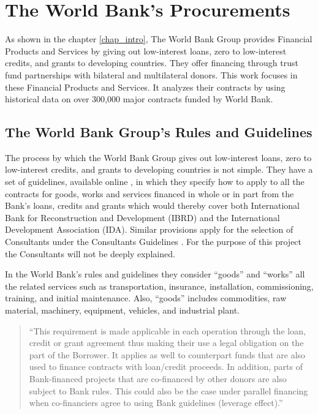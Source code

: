\chapter{The World Bank's Procurements}\label{chap_procurements}

As shown in the chapter \ref{chap_intro}, The World Bank Group provides Financial Products and Services by giving out low-interest loans, zero to low-interest credits, and grants to developing countries. They offer financing through trust fund partnerships with bilateral and multilateral donors.  This work focuses in these Financial Products and Services. It analyzes their contracts by using historical data on over 300,000 major contracts funded by World Bank.


\section{The World Bank Group's Rules and Guidelines}

The process by which the World Bank Group gives out low-interest loans, zero to low-interest credits, and grants to developing countries is not simple. They have a set of guidelines, available online \parencite{wb_g_proc}, in which they specify how to apply to all the contracts for goods, works and services financed in whole or in part from the Bank's loans, credits and grants which would thereby cover both International Bank for Reconstruction and Development (IBRD) and the International Development Association (IDA). Similar provisions apply for the selection of Consultants under the Consultants Guidelines \parencite{wb_g_cons}. For the purpose of this project the Consultants will not be deeply explained. 

In the World Bank's rules and guidelines they consider ``goods'' and ``works'' all the related services such as transportation, insurance, installation, commissioning, training, and initial maintenance. Also,  ``goods'' includes commodities, raw material, machinery, equipment, vehicles, and industrial plant. 

\begin{quote}
``This requirement is made applicable in each operation through the loan, credit or grant agreement thus making their use a legal obligation on the part of the Borrower. It applies as well to counterpart funds that are also used to finance contracts with loan/credit proceeds. In addition, parts of Bank-financed projects that are co-financed by other donors are also subject to Bank rules. This could also be the case under parallel financing when co-financiers agree to using Bank guidelines (leverage effect).''\parencite{wb_rules}
\end{quote}

